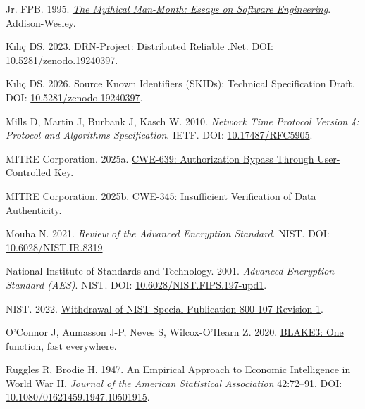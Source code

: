 \documentclass[fleqn,10pt,lineno]{wlpeerj}
\newlength{\cslhangindent}
\newenvironment{CSLReferences}[2]
 {\begin{list}{}{%
  \setlength{\itemindent}{0pt}
  \setlength{\leftmargin}{0pt}
  \setlength{\parsep}{0pt}
  \ifodd #1
   \setlength{\leftmargin}{\cslhangindent}
   \setlength{\itemindent}{-1\cslhangindent}
  \fi
  \setlength{\itemsep}{#2\baselineskip}}}
 {\end{list}}
\begin{document}
\begin{CSLReferences}{1}{0}
Jr. FPB. 1995.
\emph{\href{https://www.oreilly.com/library/view/mythical-man-month-the/0201835959/}{{The
Mythical Man-Month: Essays on Software Engineering}}}. Addison-Wesley.

Kılıç DS. 2023. {DRN-Project: Distributed Reliable .Net}. DOI:
\href{https://doi.org/10.5281/zenodo.19240397}{10.5281/zenodo.19240397}.

Kılıç DS. 2026. {Source Known Identifiers (SKIDs): Technical
Specification Draft}. DOI:
\href{https://doi.org/10.5281/zenodo.19240397}{10.5281/zenodo.19240397}.

Mills D, Martin J, Burbank J, Kasch W. 2010. \emph{{Network Time
Protocol Version 4: Protocol and Algorithms Specification}}. IETF. DOI:
\href{https://doi.org/10.17487/RFC5905}{10.17487/RFC5905}.

MITRE Corporation. 2025a.
\href{https://cwe.mitre.org/data/definitions/639.html}{{CWE-639:
Authorization Bypass Through User-Controlled Key}}.

MITRE Corporation. 2025b.
\href{https://cwe.mitre.org/data/definitions/345.html}{{CWE-345:
Insufficient Verification of Data Authenticity}}.

Mouha N. 2021. \emph{{Review of the Advanced Encryption Standard}}.
NIST. DOI:
\href{https://doi.org/10.6028/NIST.IR.8319}{10.6028/NIST.IR.8319}.

National Institute of Standards and Technology. 2001. \emph{{Advanced
Encryption Standard (AES)}}. NIST. DOI:
\href{https://doi.org/10.6028/NIST.FIPS.197-upd1}{10.6028/NIST.FIPS.197-upd1}.

NIST. 2022.
\href{https://csrc.nist.gov/news/2022/withdrawal-of-nist-sp-800-107-revision-1}{{Withdrawal
of NIST Special Publication 800-107 Revision 1}}.

O'Connor J, Aumasson J-P, Neves S, Wilcox-O'Hearn Z. 2020.
\href{https://github.com/BLAKE3-team/BLAKE3-specs/blob/master/blake3.pdf}{{BLAKE3:
One function, fast everywhere}}.

Ruggles R, Brodie H. 1947. {An Empirical Approach to Economic
Intelligence in World War II}. \emph{Journal of the American Statistical
Association} 42:72--91. DOI:
\href{https://doi.org/10.1080/01621459.1947.10501915}{10.1080/01621459.1947.10501915}.


\end{CSLReferences}
\end{document}
